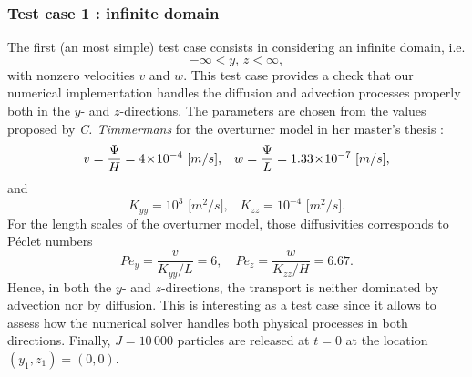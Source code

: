 \subsubsection{Test case 1 : infinite domain}
The first (an most simple) test case consists in considering an infinite domain, i.e.
\begin{equation} \label{eq:testcase:domain}
	-\infty < y,\, z < \infty,
\end{equation}
with nonzero velocities $v$ and $w$. This test case provides a check that our numerical implementation handles the diffusion and advection processes properly both in the $y$- and $z$-directions. The parameters are chosen from the values proposed by \textit{C. Timmermans} for the overturner model in her master's thesis \cite{timmermans2006masterthesis}:
\begin{equation}
	v = \frac{\Psi}{H} = 4\!\times\!10^{-4}\mbox{ [$m/s$],}\quad  w = \frac{\Psi}{L}=1.33\!\times\!10^{-7}\mbox{ [$m/s$],}
\end{equation}
and
\begin{equation}
	K_{yy} = 10^{3} \mbox{ [$m^2/s$],}\quad K_{zz} = 10^{-4} \mbox{ [$m^2/s$].} 
\end{equation}
For the length scales of the overturner model, those diffusivities corresponds to Péclet numbers
\begin{equation}
	Pe_y = \frac{v}{K_{yy}/L} = 6,\quad Pe_z = \frac{w}{K_{zz}/H} = 6.67.
\end{equation}
Hence, in both the $y$- and $z$-directions, the transport is neither dominated by advection nor by diffusion. This is interesting as a test case since it allows to assess how the numerical solver handles both physical processes in both directions. 
Finally, $J = 10\,000$ particles are released at $t=0$ at the location $(y_1,z_1) = (0,0)$.

